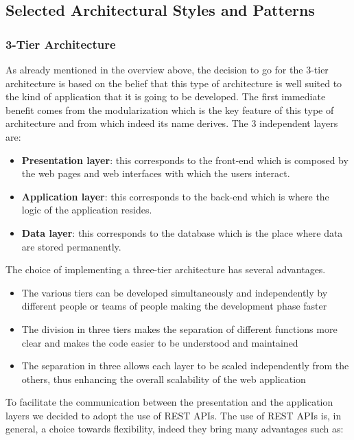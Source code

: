 \newpage
\subsection{Selected Architectural Styles and Patterns}
\subsubsection{3-Tier Architecture}
As already mentioned in the overview above, the decision to go for the 3-tier architecture is based on the belief that this type of architecture is well suited to the kind of application that it is going to be developed.
The first immediate benefit comes from the modularization which is the key feature of this type of architecture and from which indeed its name derives. The 3 independent layers are: 
\begin{itemize}
    \item \textbf{Presentation layer}: this corresponds to the front-end which is composed by the web pages and web interfaces with which the users interact.
    \item \textbf{Application layer}: this corresponds to the back-end which is where the logic of the application resides. 
    \item \textbf{Data layer}: this corresponds to the database which is the place where data are stored permanently.
\end{itemize}
The choice of implementing a three-tier architecture has several advantages.
\begin{itemize}
    \item The various tiers can be developed simultaneously and independently by different people or teams of people making the development phase faster
    \item The division in three tiers makes the separation of different functions more clear and makes the code easier to be understood and maintained
    \item The separation in three allows each layer to be scaled independently from the others, thus enhancing the overall scalability of the web application
\end{itemize}
To facilitate the communication between the presentation  and the application layers we decided to adopt the use of REST APIs. The use of REST APIs is, in general, a choice towards flexibility, indeed they bring many advantages such as:
